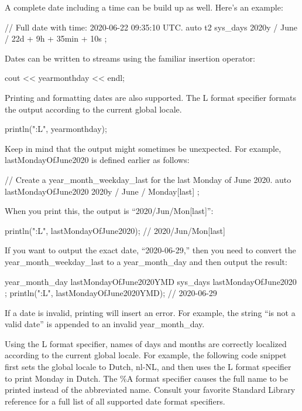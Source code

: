 A complete date including a time can be build up as well. Here’s an example:

\begin{cpp}
// Full date with time: 2020-06-22 09:35:10 UTC.
auto t2 { sys_days { 2020y / June / 22d } + 9h + 35min + 10s };
\end{cpp}


Dates can be written to streams using the familiar insertion operator:

\begin{cpp}
cout << yearmonthday << endl;
\end{cpp}

Printing and formatting dates are also supported. The L format specifier formats the output according to the current global locale.

\begin{cpp}
println("{:L}", yearmonthday);
\end{cpp}

Keep in mind that the output might sometimes be unexpected. For example, lastMondayOfJune2020 is defined earlier as follows:

\begin{cpp}
// Create a year_month_weekday_last for the last Monday of June 2020.
auto lastMondayOfJune2020 { 2020y / June / Monday[last] };
\end{cpp}

When you print this, the output is “2020/Jun/Mon[last]”:

\begin{cpp}
println("{:L}", lastMondayOfJune2020); // 2020/Jun/Mon[last]
\end{cpp}

If you want to output the exact date, “2020-06-29,” then you need to convert the year\_month\_weekday\_last to a year\_month\_day and then output the result:

\begin{cpp}
year_month_day lastMondayOfJune2020YMD { sys_days { lastMondayOfJune2020 } };
println("{:L}", lastMondayOfJune2020YMD); // 2020-06-29
\end{cpp}

If a date is invalid, printing will insert an error. For example, the string “is not a valid date” is appended to an invalid year\_month\_day.

Using the L format specifier, names of days and months are correctly localized according to the current global locale. For example, the following code snippet first sets the global locale to Dutch, nl-NL, and then uses the L format specifier to print Monday in Dutch. The \%A format specifier causes the full name to be printed instead of the abbreviated name. Consult your favorite Standard Library reference for a full list of all supported date format specifiers.

